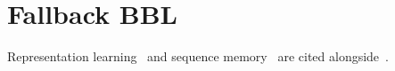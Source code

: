 \documentclass{article}
\begin{document}
\section{Fallback BBL}\label{sec:fallback}
Representation learning~\citep{lecun2015} and sequence memory~\citet{hochreiter1997} are cited alongside~\cite{who2021}.


\end{document}
